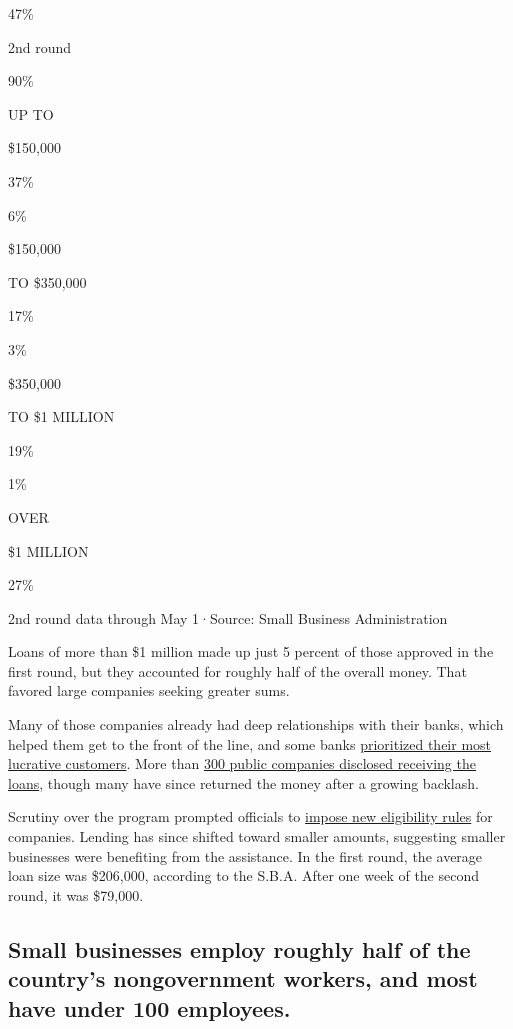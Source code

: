 47\%

2nd round

90\%

UP TO

\$150,000

37\%

6\%

\$150,000

TO \$350,000

17\%

3\%

\$350,000

TO \$1 MILLION

19\%

1\%

OVER

\$1 MILLION

27\%

2nd round data through May 1·Source: Small Business Administration

Loans of more than \$1 million made up just 5 percent of those approved
in the first round, but they accounted for roughly half of the overall
money. That favored large companies seeking greater sums.

Many of those companies already had deep relationships with their banks,
which helped them get to the front of the line, and some banks
\href{https://www.nytimes3xbfgragh.onion/2020/04/22/business/sba-loans-ppp-coronavirus.html}{prioritized
their most lucrative customers}. More than
\href{https://www.nytimes3xbfgragh.onion/2020/05/04/business/live-stock-market-coronavirus.html\#link-48f11fd9}{300
public companies disclosed receiving the loans}, though many have since
returned the money after a growing backlash.

Scrutiny over the program prompted officials to
\href{https://www.nytimes3xbfgragh.onion/2020/04/28/us/politics/coronavirus-treasury-payment-protection-program.html}{impose
new eligibility rules} for companies. Lending has since shifted toward
smaller amounts, suggesting smaller businesses were benefiting from the
assistance. In the first round, the average loan size was \$206,000,
according to the S.B.A. After one week of the second round, it was
\$79,000.

\hypertarget{small-businesses-employ-roughly-half-of-the-countrys-nongovernment-workers-and-most-have-under-100-employees}{%
\subsection{Small businesses employ roughly half of the country's
nongovernment workers, and most have under 100
employees.}\label{small-businesses-employ-roughly-half-of-the-countrys-nongovernment-workers-and-most-have-under-100-employees}}

